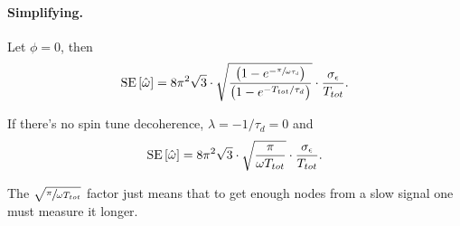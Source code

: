 \documentclass[14pt]{article}
\begin{document}
	
\paragraph{Simplifying.}
Let $\phi = 0$, then
\[
	\SE{\hat{\omega}} = 8\pi^2\sqrt{3}\cdot\sqrt{\frac{\bkt{1-e^{-\sfrac{\pi}{\omega\tau_d}}}}{\bkt{1 - e^{-T_{tot}/\tau_d}}}}\cdot\frac{\SD{\obs}}{T_{tot}}.
\]

If there's no spin tune decoherence, $\lambda = -1/\tau_d = 0$ and
\[
	\SE{\hat{\omega}} = 8\pi^2\sqrt{3}\cdot \sqrt{\frac{\pi}{\omega T_{tot}}}\cdot\frac{\SD{\obs}}{ T_{tot}}.
\]

The $\sqrt{\sfrac{\pi}{\omega T_{tot}}}$ factor just means that to get enough nodes from a slow signal one must measure it longer.
\end{document}
